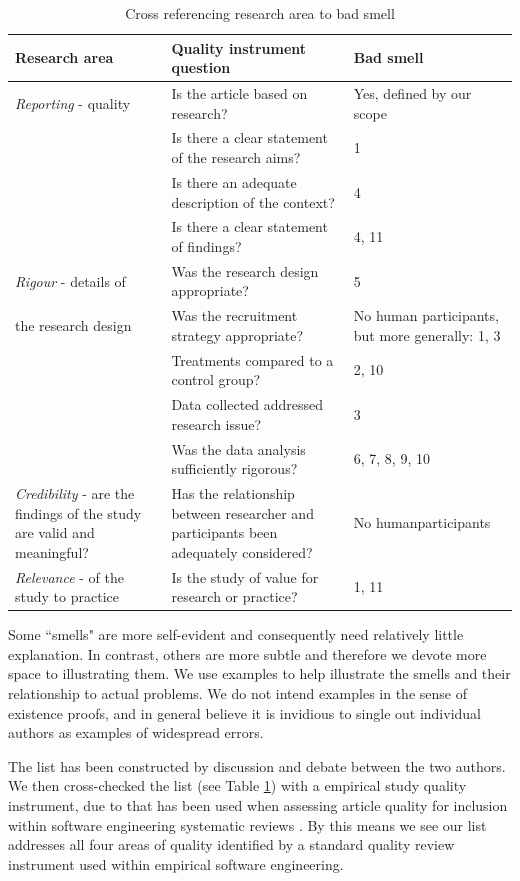 \documentclass[preprint,10pt]{elsarticle}
\begin{document}
\begin{table}[!b]
\caption{Cross referencing research area to bad smell }
\small
\begin{center}
\begin{tabular}{|p{3cm}|p{6cm}|p{2cm}|}
\hline
\textbf{Research area} \cite{Kitc15} & \textbf{Quality instrument question} \cite[Table 3]{Dyba08} & \textbf{Bad smel}l\\
\hline
\textit{Reporting} - quality  & Is the article based on research? & Yes, defined by our scope \\
& Is there a clear statement of the research aims? & 1 \\
& Is there an adequate description of the context? & 4 \\
& Is there a clear statement of findings? & 4, 11 \\
\hline
\textit{Rigour} -  details of  & Was the research design appropriate? & 5 \\
the research design & Was the recruitment strategy appropriate? & No human participants, but more generally: 1, 3 \\
& Treatments compared to a  control group? & 2, 10 \\
& Data collected   addressed   research issue? & 3 \\
& Was the data analysis sufficiently rigorous? & 6, 7, 8, 9, 10 \\ 
\hline
\textit{Credibility} - are the findings of the study are valid and meaningful? & Has the relationship between researcher and participants been adequately considered?& No human\newline participants \\
\hline
\textit{Relevance} -  of the study to practice & Is the study of value for research or practice? & 1, 11\\
\hline
\end{tabular}
\end{center}
\label{Tab:Xref}
\end{table}%

Some ``smells" are more self-evident and consequently need relatively little explanation.  In contrast, others are more subtle and therefore we devote more space to illustrating them.  We use examples to help illustrate the smells and their relationship to actual problems.  We do not intend examples in the sense of existence proofs, and in general believe it is invidious to single out individual authors as examples of widespread errors.

The list has been constructed by discussion and debate between the two authors.  We then cross-checked the list (see Table \ref{Tab:Xref}) with a empirical study quality instrument, due to \cite{Dyba08} that has been used when assessing article quality for inclusion within software engineering systematic reviews \cite[chapter 7]{Kitc15}.  By this means we see our list addresses all four areas of quality identified by a standard quality review instrument used within empirical software engineering.  
\end{document}
